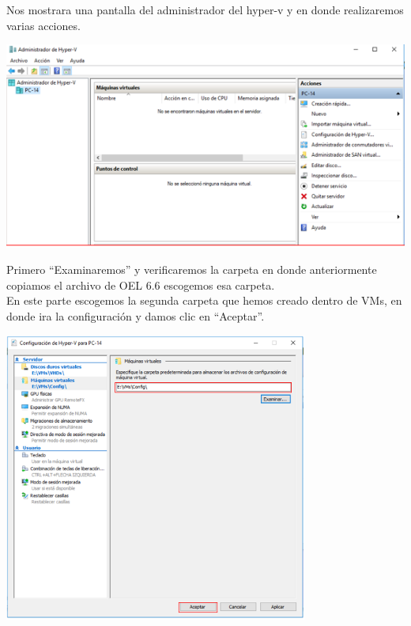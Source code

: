 \vspace{\baselineskip}

Nos mostrara una pantalla del administrador del hyper-v y en donde realizaremos varias acciones. 
\begin{center}
	\includegraphics[width=16cm]{./Imagenes/9} 
\end{center}

\vspace{\baselineskip}
\vspace{\baselineskip}

Primero “Examinaremos” y verificaremos la carpeta en donde anteriormente copiamos el archivo de OEL 6.6 escogemos esa carpeta. 
\\
En este parte escogemos la segunda carpeta que hemos creado dentro de VMs, en donde ira la configuración y damos clic en “Aceptar”. 
\begin{center}
	\includegraphics[width=10cm]{./Imagenes/10} 
\end{center}

